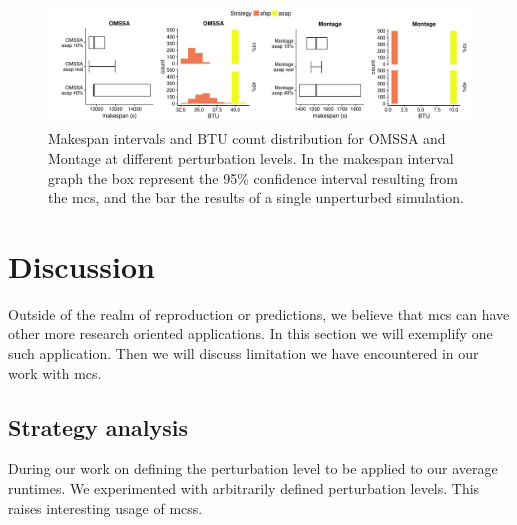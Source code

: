 \documentclass[10pt,conference,compsocconf]{IEEEtran}
\begin{document}

\begin{figure}
	\includegraphics[width=\textwidth]{gfx/int_plot.pdf}
	\caption{Makespan intervals and BTU count distribution for OMSSA and 
	Montage at different perturbation levels. In the makespan interval graph 
	the box represent the 95\% confidence interval resulting from the \acs{mcs},
	and the bar the results of a single unperturbed simulation.}\label{fig:int}
\end{figure}


\section{Discussion}

Outside of the realm of reproduction or predictions, we believe that \ac{mcs}
can have other more research oriented applications. In this section we will
exemplify one such application. Then we will discuss limitation we have
encountered in our work with \ac{mcs}.

\subsection{Strategy analysis}\label{sec:sa}
During our work on defining the perturbation level to be applied to our average
runtimes. We experimented with arbitrarily defined perturbation levels. This
raises interesting usage of \acp{mcs}.
\end{document}

